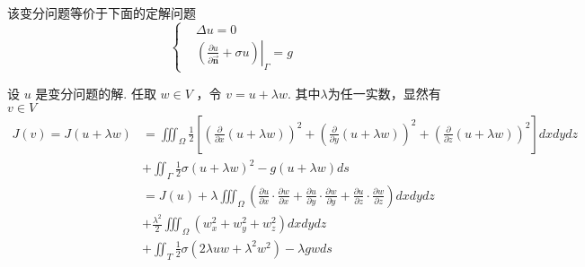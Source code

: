 \begin{questions}
\begin{solution}
该变分问题等价于下面的定解问题
$$
\left\{\begin{aligned}
&\Delta u=0 \\
&\left.\left(\frac{\partial u}{\partial \vec{\boldsymbol{n}}}+\sigma u\right)\right|_{\Gamma}=g
\end{aligned}\right.
$$

设 $ u $ 是变分问题的解. 任取 $ w \in V $ ，令 $ v=u+\lambda w $.
其中$\lambda$为任一实数，显然有 $ v \in V $
$$
\begin{aligned}
J(v)=J(u+\lambda w)&=\iiint_{\Omega} \frac{1}{2}\left[\left(\frac{\partial}{\partial x}(u+\lambda w)\right)^{2}+\left(\frac{\partial}{\partial y}(u+\lambda w)\right)^{2}+\left(\frac{\partial}{\partial z}(u+\lambda w)\right)^{2}\right] 
d x d y d z\\&+\iint_{\Gamma}\frac{1}{2} \sigma(u+\lambda w)^{2}-g(u+\lambda w) d s \\
&=J(u)+\lambda \iiint_{\Omega}\left(\frac{\partial u}{\partial x} \cdot \frac{\partial w}{\partial x}+\frac{\partial u}{\partial y} \cdot \frac{\partial w}{\partial y}+\frac{\partial u}{\partial z} \cdot \frac{\partial w}{\partial z}\right) d x d y d z\\&+\frac{\lambda^{2}}{2} \iiint_{\Omega}\left(w_{x}^{2}+w_{y}^{2}+w_{z}^{2}\right) d x d y d z \\
&+\iint_{T} \frac{1}{2} \sigma\left(2 \lambda u w+\lambda^{2} w^{2}\right)-\lambda g w d s
\end{aligned}
$$


\end{solution}
\end{questions}
